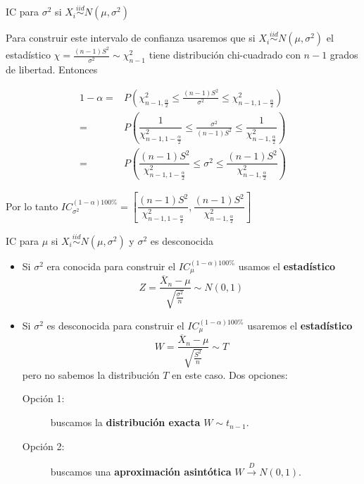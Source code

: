 \documentclass{beamer}
\theoremstyle{definition}
\begin{document}
\begin{frame}{\color{rosee} IC para $\sigma^2$ si $X_i\stackrel{iid}{\sim}N(\mu,\sigma^2)$}

    \small Para construir este intervalo de confianza usaremos que si $X_i\stackrel{iid}{\sim}N(\mu,\sigma^2)$ el estadístico $\chi=\frac{(n-1)S^2}{\sigma^2}\sim \chi^2_{n-1}$ tiene distribución chi-cuadrado con $n-1$ grados de libertad. Entonces

    \begin{align*}
       1-\alpha =& P\left(\chi^2_{n-1,\frac{\alpha}{2}}\leq \frac{(n-1)S^2}{\sigma^2}\leq \chi^2_{n-1,1-\frac{\alpha}{2}}\right)\\
       =& P\left(\dfrac{1}{\chi^2_{n-1,1-\frac{\alpha}{2}}}\leq \frac{\sigma^2}{(n-1)S^2}\leq \dfrac{1}{\chi^2_{n-1,\frac{\alpha}{2}}}\right)\\
       =& P\left(\dfrac{(n-1)S^2}{\chi^2_{n-1,1-\frac{\alpha}{2}}}\leq \sigma^2\leq \dfrac{(n-1)S^2}{\chi^2_{n-1,\frac{\alpha}{2}}}\right)
    \end{align*}

    Por lo tanto $IC_{\sigma^2}^{(1-\alpha)100\%}=\left[\dfrac{(n-1)S^2}{\chi^2_{n-1,1-\frac{\alpha}{2}}}, \dfrac{(n-1)S^2}{\chi^2_{n-1,\frac{\alpha}{2}}}\right]$
\end{frame}


\begin{frame}{\color{rosee}IC para $\mu$ si $X_i\stackrel{iid}{\sim}N(\mu,\sigma^2)$ y $\sigma^2$ es desconocida}\small
  \begin{itemize}
  \item Si $\sigma^2$ era conocida para construir el $IC_{\mu}^{(1-\alpha)100\%}$ usamos el \textbf{estadístico}
    \[ Z=\frac{\overline{X}_{n} - \mu}{\sqrt{\frac{\sigma^2}{n}}} \sim
      N(0,1) \]
  \item Si $\sigma^2$ es desconocida para construir el $IC_{\mu}^{(1-\alpha)100\%}$ usaremos el \textbf{estadístico} 
    \[ W=\frac{\overline{X}_{n} - \mu}{\sqrt{\frac{S^2}{n}}} \sim T \] pero no
    sabemos la distribuci\'on $T$ en este caso. Dos opciones:
    \begin{description}
    \item[Opci\'on 1:] buscamos la \textbf{distribuci\'on exacta} $W\sim t_{n-1}$. 
    \item[Opci\'on 2:] buscamos una \textbf{aproximaci\'on asint\'otica} $W\stackrel{D}{\to}N(0,1)$.
  \end{description}
  \end{itemize}
\end{frame}
\end{document}
